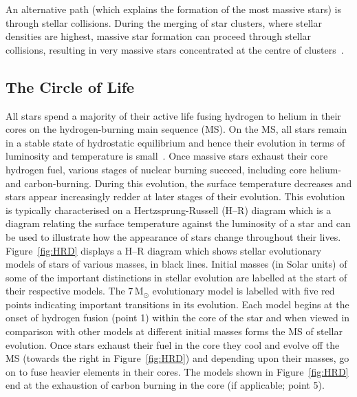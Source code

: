 An alternative path (which explains the formation of the most massive stars) is through stellar collisions.
During the merging of star clusters, where stellar densities are highest, massive star formation can proceed through stellar collisions, resulting in very massive stars concentrated at the centre of clusters~\citep{Fujii13}.



\subsection{The Circle of Life} %
\label{sub:life_cycle}

All stars spend a majority of their active life fusing hydrogen to helium in their cores on the hydrogen-burning main sequence (MS).
On the MS, all stars remain in a stable state of hydrostatic equilibrium and hence their evolution in terms of luminosity and temperature is small~\citep{2012sse..book.....K}.
Once massive stars exhaust their core hydrogen fuel, various stages of nuclear burning succeed, including core helium- and carbon-burning.
During this evolution, the surface temperature decreases and stars appear increasingly redder at later stages of their evolution.
This evolution is typically characterised on a Hertzsprung-Russell (H--R) diagram which is a diagram relating the surface temperature against the luminosity of a star and can be used to illustrate how the appearance of stars change throughout their lives.
Figure~\ref{fig:HRD} displays a H--R diagram which shows stellar evolutionary models of stars of various masses, in black lines.
Initial masses (in Solar units) of some of the important distinctions in stellar evolution are labelled at the start of their respective models.
The 7\,M$_{\odot}$ evolutionary model is labelled with five red points indicating important transitions in its evolution.
Each model begins at the onset of hydrogen fusion (point 1) within the core of the star and when viewed in comparison with other models at different initial masses forms the MS of stellar evolution.
Once stars exhaust their fuel in the core they cool and evolve off the MS (towards the right in Figure~\ref{fig:HRD}) and depending upon their masses, go on to fuse heavier elements in their cores.
The models shown in Figure~\ref{fig:HRD} end at the exhaustion of carbon burning in the core (if applicable; point 5).


